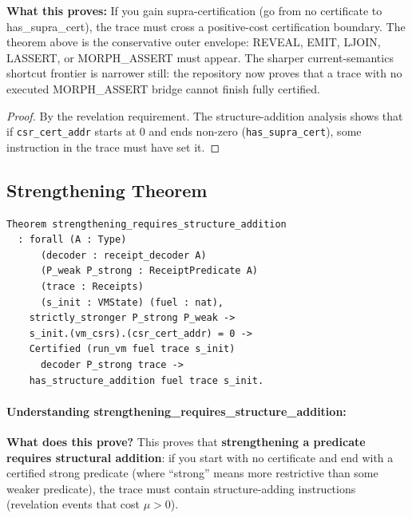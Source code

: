 \textbf{What this proves:} If you gain supra-certification (go from no certificate to has\_supra\_cert), the trace must cross a positive-cost certification boundary. The theorem above is the conservative outer envelope: REVEAL, EMIT, LJOIN, LASSERT, or MORPH\_ASSERT must appear. The sharper current-semantics shortcut frontier is narrower still: the repository now proves that a trace with no executed MORPH\_ASSERT bridge cannot finish fully certified.

\begin{proof}
By the revelation requirement. The structure-addition analysis shows that if \texttt{csr\_cert\_addr} starts at 0 and ends non-zero (\texttt{has\_supra\_cert}), some instruction in the trace must have set it.
\end{proof}

\subsection{Strengthening Theorem}

\begin{theorem}
\begin{lstlisting}
Theorem strengthening_requires_structure_addition
  : forall (A : Type)
      (decoder : receipt_decoder A)
      (P_weak P_strong : ReceiptPredicate A)
      (trace : Receipts)
      (s_init : VMState) (fuel : nat),
    strictly_stronger P_strong P_weak ->
    s_init.(vm_csrs).(csr_cert_addr) = 0 ->
    Certified (run_vm fuel trace s_init)
      decoder P_strong trace ->
    has_structure_addition fuel trace s_init.
\end{lstlisting}
\end{theorem}

\paragraph{Understanding strengthening\_requires\_structure\_addition:}

\textbf{What does this prove?} This proves that \textbf{strengthening a predicate requires structural addition}: if you start with no certificate and end with a certified strong predicate (where ``strong'' means more restrictive than some weaker predicate), the trace must contain structure-adding instructions (revelation events that cost $\mu > 0$).

